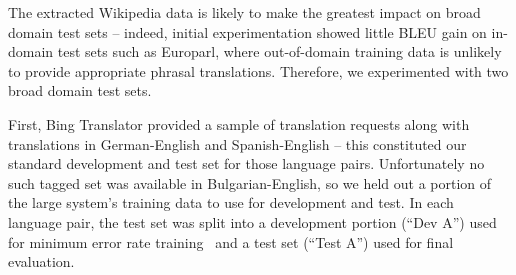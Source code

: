 The extracted Wikipedia data is likely to make the greatest impact on broad
domain test sets -- indeed, initial experimentation showed little BLEU gain
on in-domain test sets such as Europarl, where out-of-domain training data
is unlikely to provide appropriate phrasal translations.  Therefore, we
experimented with two broad domain test sets.

First, Bing Translator provided a sample of translation
requests along with translations in German-English and
Spanish-English -- this constituted our standard development and
test set for those language pairs.  Unfortunately no such tagged
set was available in Bulgarian-English, so we held out a portion
of the large system's training data to use for development and
test. In each language pair, the test set was split into a
development portion (``Dev A'') used for minimum error rate
training~\citep{OchMert03} and a test set (``Test A'') used
for final evaluation.

